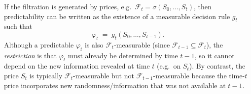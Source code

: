 \documentclass[11pt]{article}
\begin{document}
If the filtration is generated by prices, e.g.\ $\mathcal F_t=\sigma(S_0,\dots,S_t)$, then predictability can be written as the existence of a measurable decision rule $g_t$ such that
\[
\varphi_t \;=\; g_t(S_0,\dots,S_{t-1}).
\]
Although a predictable $\varphi_t$ is also $\mathcal F_t$-measurable (since $\mathcal F_{t-1}\subseteq \mathcal F_t$), the \emph{restriction} is that $\varphi_t$ must already be determined by time $t-1$, so it cannot depend on the new information revealed at time $t$ (e.g.\ on $S_t$).
By contrast, the price $S_t$ is typically $\mathcal F_t$-measurable but not $\mathcal F_{t-1}$-measurable because the time-$t$ price incorporates new randomness/information that was not available at $t-1$.
\end{document}
